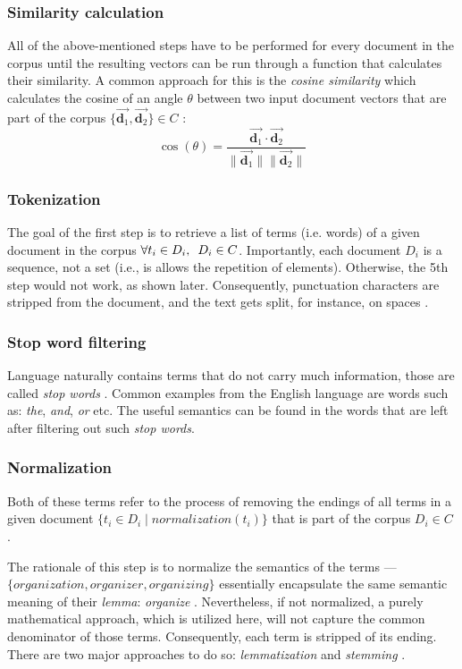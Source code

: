 \documentclass[12pt,a4paper]{report}
\begin{document}
\subsubsection{Similarity calculation} All of the above-mentioned steps have to
be performed for every document in the corpus until the resulting vectors can
be run through a function that calculates their similarity. A common approach
for this is the \textit{cosine similarity} which calculates the cosine of an
angle \(\theta\) between two input document vectors that are part of the corpus
\(\{\vec{\mathbf d_1}, \vec{\mathbf d_2}\} \in C\) \cite{singhal2001ir}:
\[
  \cos(\theta) = \frac{
    \vec{\mathbf d_1} \cdot \vec{\mathbf d_2}
  }{
    \|\vec{\mathbf d_1} \|\|\vec{\mathbf d_2} \|
  }
\]


\subsubsection{Tokenization}
The goal of the first step is to retrieve a list
of terms (i.e. words) of a given document in the corpus
\(\forall t_i \in D_i, \enskip D_i \in C\).
Importantly, each document \(D_i\) is a sequence, not a
set (i.e., is allows the repetition of elements). Otherwise, the 5th step would
not work, as shown later. Consequently, punctuation characters are stripped
from the document, and the text gets split, for instance, on spaces \cite{singhal2001ir}.


\subsubsection{Stop word filtering}
Language naturally contains terms that do
not carry much information, those are called \textit{stop words}
\cite{singhal2001ir}. Common examples from the English language are words such as:
\textit{the}, \textit{and}, \textit{or} etc. The useful semantics can be found
in the words that are left after filtering out such \textit{stop words}.


\subsubsection{Normalization}
Both of these terms refer to the process of
removing the endings of all terms in a given document
\(\{t_i \in D_i \mid normalization(t_i)\}\) that is part of the corpus
\(D_i \in C\) \cite{singhal2001ir}.

The rationale of this step is to normalize the semantics of the terms ---\\
\(\{\textit{organization}, \textit{organizer}, \textit{organizing}\}\) essentially
encapsulate the same semantic meaning of their \textit{lemma}: \textit{organize}
. Nevertheless, if not normalized, a purely mathematical approach, which is
utilized here, will not capture the common denominator of those terms.
Consequently, each term is stripped of its ending. There are two major
approaches to do so: \textit{lemmatization} and \textit{stemming}
\cite{plisson2004lemma}.
\end{document}
